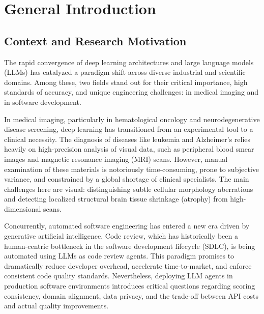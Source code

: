 
\section{General Introduction}
\label{sec:intro}

\subsection{Context and Research Motivation}

The rapid convergence of deep learning architectures and large language models (LLMs) has catalyzed a paradigm shift across diverse industrial and scientific domains. Among these, two fields stand out for their critical importance, high standards of accuracy, and unique engineering challenges:  in medical imaging and  in software development.

In medical imaging, particularly in hematological oncology and neurodegenerative disease screening, deep learning has transitioned from an experimental tool to a clinical necessity. The diagnosis of diseases like leukemia and Alzheimer's relies heavily on high-precision analysis of visual data, such as peripheral blood smear images and magnetic resonance imaging (MRI) scans. However, manual examination of these materials is notoriously time-consuming, prone to subjective variance, and constrained by a global shortage of clinical specialists. The main challenges here are visual: distinguishing subtle cellular morphology aberrations and detecting localized structural brain tissue shrinkage (atrophy) from high-dimensional scans.

Concurrently, automated software engineering has entered a new era driven by generative artificial intelligence. Code review, which has historically been a human-centric bottleneck in the software development lifecycle (SDLC), is being automated using LLMs as code review agents. This paradigm promises to dramatically reduce developer overhead, accelerate time-to-market, and enforce consistent code quality standards. Nevertheless, deploying LLM agents in production software environments introduces critical questions regarding scoring consistency, domain alignment, data privacy, and the trade-off between API costs and actual quality improvements.

